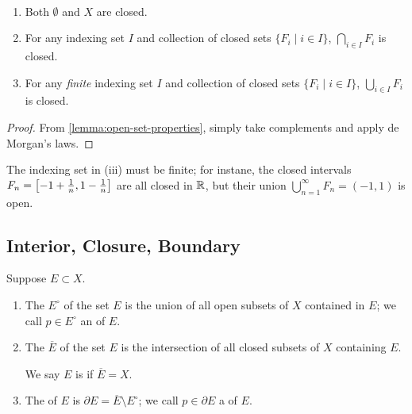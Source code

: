 \begin{lemma}\label{lemma:closed-set-properties} \
\begin{enumerate}[label=(\roman*)]
\item Both $\emptyset$ and $X$ are closed.
\item For any indexing set $I$ and collection of closed sets $\{F_i\mid i\in I\}$, $\bigcap_{i\in I}F_i$ is closed.
\item For any \emph{finite} indexing set $I$ and collection of closed sets $\{F_i\mid i\in I\}$, $\bigcup_{i\in I}F_i$ is closed.
\end{enumerate}
\end{lemma}

\begin{proof}
From \ref{lemma:open-set-properties}, simply take complements and apply de Morgan's laws.
\end{proof}

\begin{remark}
The indexing set in (iii) must be finite; for instane, the closed intervals $F_n=\left[-1+\frac{1}{n},1-\frac{1}{n}\right]$ are all closed in $\mathbb R$, but their union $\bigcup_{n=1}^\infty F_n=(-1,1)$ is open.
\end{remark}
\pagebreak

\subsection{Interior, Closure, Boundary}
\begin{definition}
Suppose $E\subset X$.
\begin{enumerate}[label=(\roman*)]
\item The  $E^\circ$ of the set $E$ is the union of all open subsets of $X$ contained in $E$; we call $p\in E^\circ$ an  of $E$. 

\item The  $\overline{E}$ of the set $E$ is the intersection of all closed subsets of $X$ containing $E$.

We say $E$ is  if $\overline{E}=X$. 

\item The  of $E$ is $\partial E=\overline{E}\setminus E^\circ$; we call $p\in\partial E$ a  of $E$.
\end{enumerate}
\end{definition}

